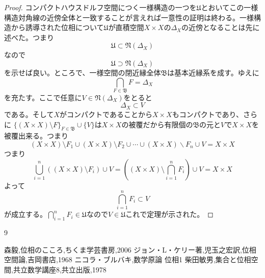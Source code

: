 \documentclass[leqno]{jsarticle}
\begin{document}
\begin{proof}コンパクトハウスドルフ空間につく一様構造の一つを$\mathfrak{U}$とおいてこの一様構造対角線の近傍全体と一致することが言えれば一意性の証明は終わる。一様構造から誘導された位相について$\mathfrak{U}$が直積空間$X\times X$の$\Delta_{X}$の近傍となることは先に述べた。つまり
\[
\mathfrak{U}\subset \mathfrak{N}(\Delta_{X})
\]なので
\[
\mathfrak{U}\supset \mathfrak{N}(\Delta_{X})
\]を示せば良い。ところで、一様空間の閉近縁全体$\mathfrak{B}$は基本近縁系を成す。ゆえに
\[
\bigcap_{F\in \mathfrak{B}}F=\Delta_{X}
\]を充たす。ここで任意に$V\in \mathfrak{N}(\Delta_{X})$をとると
\[
\Delta_{X}\subset V
\]である。そして$X$がコンパクトであることから$X\times X$もコンパクトであり、さらに
$\{(X\times X)\setminus F\}_{F\in \mathfrak{B}}\cup \{V\}$は$X\times X$の被覆だから有限個の$\mathfrak{B}$の元と$V$で$X\times X$を被覆出来る。つまり
\[
(X\times X)\setminus F_{1}\cup (X\times X)\setminus F_{2}\cup \cdots \cup (X\times X)\backslash F_{n}\cup V=X\times X
\]
つまり
\[
\bigcup_{i=1}^{n}((X\times X)\setminus F_{i})\cup V=((X\times X)\setminus \bigcap_{i=1}^{n}F_{i})\cup V=X\times X
\]
よって
\[
\bigcap_{i=1}^{n}F_{i}\subset V
\]が成立する。$\displaystyle \bigcap_{i=1}^{n}F_{i}\in \mathfrak{U}なのでV\in \mathfrak{U}これで定理が示された。$
\end{proof}












	
\begin{thebibliography}{9}

森毅,位相のこころ,ちくま学芸書房,2006
ジョン・L・ケリー著,児玉之宏訳,位相空間論,吉岡書店,1968
ニコラ・ブルバキ,数学原論 位相1
柴田敏男,集合と位相空間,共立数学講座8,共立出版,1978
\end{thebibliography}




			
\end{document}
